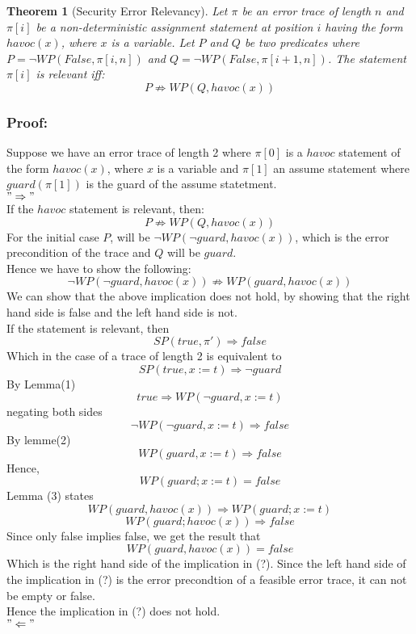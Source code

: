 \documentclass{article}
\newcommand{\limp}{\Rightarrow}
\newtheorem{theorem}{Theorem}
\begin{document}
\begin{theorem}[Security Error Relevancy] 
Let $\pi$ be an error trace of length $n$ and $\pi[i]$ be a non-deterministic assignment statement at position $i$ having the form $havoc(x)$, where $x$ is a variable. Let $P$ and $Q$ be two predicates where $P = \neg WP(False, \pi[i,n])$ and $Q = \neg WP(False, \pi[i+1,n])$. The statement $\pi[i]$ is relevant iff:
 $$P \not\limp WP(Q,havoc(x))$$
\end{theorem}

\subsubsection*{Proof:}
Suppose we have an error trace of length 2 where $\pi[0]$ is a $havoc$ statement of the form $havoc(x)$, where $x$ is a variable and $\pi[1]$ an assume statement where $guard(\pi[1])$ is the guard of the assume statetment.\\
$"\Rightarrow"$\\
If the $havoc$ statement is relevant,  then:
$$P \not\limp WP(Q,havoc(x))$$
For the initial case $P$, will be $\neg WP(\neg guard, havoc(x))$, which is the error precondition of the trace and $Q$ will be $guard$.\\
Hence we have to show the following:
\begin{equation}
\neg WP(\neg guard, havoc(x)) \not\limp WP(guard, havoc(x))
\end{equation}
We can show that the above implication does not hold, by showing that the right hand side is false and the left hand side is not.\\
If the statement is relevant, then
$$SP(true, \pi') \Rightarrow false$$
Which in the case of a trace of length 2 is equivalent to
$$SP(true, x:=t) \Rightarrow \neg guard$$
By Lemma(1)
$$true  \Rightarrow WP(\neg guard, x:=t)$$
negating both sides
$$ \neg WP(\neg guard, x:=t) \Rightarrow false $$
By lemme(2)
$$WP(guard, x:=t) \Rightarrow false$$
Hence,
$$ WP(guard; x:=t) = false$$
Lemma (3) states
$$WP(guard, havoc(x)) \Rightarrow WP(guard; x:=t)$$
$$WP(guard; havoc(x)) \Rightarrow false$$
Since only false implies false, we get the result that 
$$WP(guard, havoc(x)) = false$$
Which is the right hand side of the implication in (?).
Since the left hand side of the implication in (?) is the error precondtion of a feasible error trace, it can not be empty or false. \\
Hence the implication in (?) does not hold.\\
$"\Leftarrow"$\\
\end{document}
